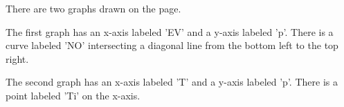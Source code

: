 There are two graphs drawn on the page.

The first graph has an x-axis labeled 'EV' and a y-axis labeled 'p'. There is a curve labeled 'NO' intersecting a diagonal line from the bottom left to the top right.

The second graph has an x-axis labeled 'T' and a y-axis labeled 'p'. There is a point labeled 'Ti' on the x-axis.